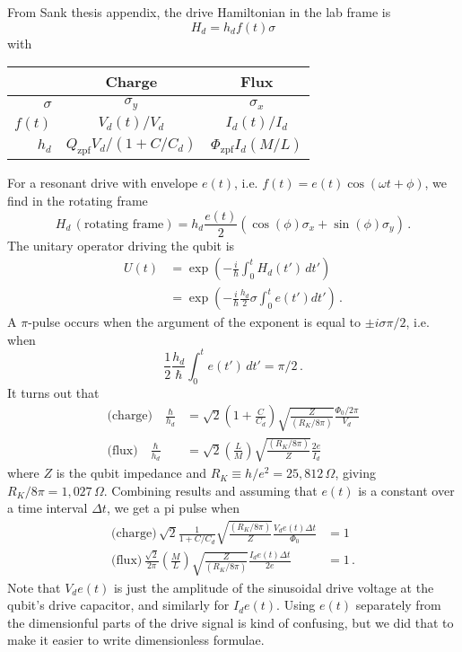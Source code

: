 From Sank thesis appendix, the drive Hamiltonian in the lab frame is
\begin{equation*}
  H_d = h_d f(t) \sigma
\end{equation*}
with
\begin{center}
  \begin{tabular}{r | c | c}
    & \textbf{Charge} & \textbf{Flux} \\
    \hline
    $\sigma$ & $\sigma_y$ & $\sigma_x$ \\
    \hline
    $f(t)$ & $V_d(t)/V_d$ & $I_d(t) / I_d$ \\
    \hline
    $h_d$ & $Q_\text{zpf} V_d/(1+C/C_d)$ & $\Phi_\text{zpf} I_d (M/L)$
  \end{tabular}
\end{center}
For a resonant drive with envelope $e(t)$, i.e. $f(t) = e(t) \cos(\omega t + \phi)$, we find in the rotating frame
\begin{equation*}
  H_d \, (\text{rotating frame}) = h_d \frac{e(t)}{2} \left( \cos(\phi) \sigma_x + \sin(\phi) \sigma_y \right) \, .
\end{equation*}
The unitary operator driving the qubit is
\begin{align*}
  U(t)
  &= \exp \left( -\frac{i}{\hbar} \int_0^t H_d(t') \, dt' \right) \\
  &= \exp \left( -\frac{i}{\hbar} \frac{h_d}{2} \sigma \int_0^t e(t') dt' \right) \, .
\end{align*}
A $\pi$-pulse occurs when the argument of the exponent is equal to $\pm i \sigma \pi / 2$, i.e. when
\begin{equation*}
  \frac{1}{2} \frac{h_d}{\hbar} \int_0^t e(t') \, dt' = \pi / 2 \, .
\end{equation*}
It turns out that
\begin{align*}
  \text{(charge)} \quad \frac{\hbar}{h_d} &=
  \sqrt{2} \left( 1 + \frac{C}{C_d} \right) \sqrt{\frac{Z}{(R_K / 8\pi)}} \frac{\Phi_0/2\pi}{V_d} \\
  \text{(flux)} \quad \frac{\hbar}{h_d} &=
  \sqrt{2} \left( \frac{L}{M} \right) \sqrt{\frac{(R_K/8\pi)}{Z}} \frac{2e}{I_d}
\end{align*}
where $Z$ is the qubit impedance and $R_K \equiv h/e^2 = 25,812 \, \Omega$, giving $R_K/8\pi = 1,027 \, \Omega$.
Combining results and assuming that $e(t)$ is a constant over a time interval $\Delta t$,  we get a pi pulse when
\begin{align*}
  \text{(charge)} \, \sqrt{2} \frac{1}{1 + C/C_d} \sqrt{\frac{(R_K/8\pi)}{Z}} \frac{V_d e(t) \Delta t}{\Phi_0} &= 1 \\
  \text{(flux)} \, \frac{\sqrt{2}}{2 \pi} \left( \frac{M}{L} \right) \sqrt{\frac{Z}{(R_K/8\pi)}} \frac{I_d e(t) \Delta t}{2e} &= 1 \, .
\end{align*}
Note that $V_d e(t)$ is just the amplitude of the sinusoidal drive voltage at the qubit's drive capacitor, and similarly for $I_d e(t)$.
Using $e(t)$ separately from the dimensionful parts of the drive signal is kind of confusing, but we did that to make it easier to write dimensionless formulae.

